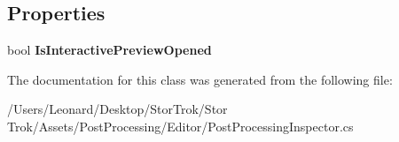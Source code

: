 \subsection*{Properties}
\begin{DoxyCompactItemize}
\item 
\mbox{\label{class_unity_editor_1_1_post_processing_1_1_post_processing_inspector_a95749af46df26c3932a587113daf1aa2}} 
bool {\bfseries Is\+Interactive\+Preview\+Opened}
\end{DoxyCompactItemize}


The documentation for this class was generated from the following file\+:\begin{DoxyCompactItemize}
\item 
/\+Users/\+Leonard/\+Desktop/\+Stor\+Trok/\+Stor Trok/\+Assets/\+Post\+Processing/\+Editor/Post\+Processing\+Inspector.\+cs\end{DoxyCompactItemize}
